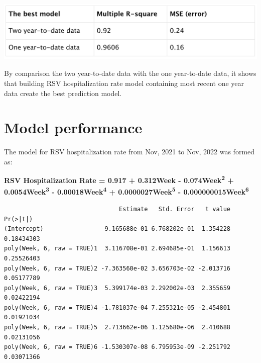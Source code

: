 \documentclass[
  letterpaper,
  DIV=11,
  numbers=noendperiod]{scrreport}
\newenvironment{Shaded}{\begin{snugshade}}{\end{snugshade}}
\newcommand{\CommentTok}[1]{\textcolor[rgb]{0.37,0.37,0.37}{#1}}
\newcommand{\FunctionTok}[1]{\textcolor[rgb]{0.28,0.35,0.67}{#1}}
\newcommand{\NormalTok}[1]{\textcolor[rgb]{0.00,0.23,0.31}{#1}}
\newcommand{\OtherTok}[1]{\textcolor[rgb]{0.00,0.23,0.31}{#1}}
\newcommand{\SpecialCharTok}[1]{\textcolor[rgb]{0.37,0.37,0.37}{#1}}
\begin{document}
\begin{Shaded}
\end{Shaded}

\includegraphics[width=5.875in,height=\textheight]{./images/paste-09152757.png}

By comparison the two year-to-date data with the one year-to-date data,
it shows that building RSV hospitalization rate model containing most
recent one year data create the best prediction model.

\hypertarget{model-performance}{%
\section{Model performance}\label{model-performance}}

The model for RSV hospitalization rate from Nov, 2021 to Nov, 2022 was
formed as:

\textbf{RSV Hospitalization Rate = 0.917 + 0.312Week -
0.074Week\textsuperscript{2} + 0.0054Week\textsuperscript{3} -
0.00018Week\textsuperscript{4} + 0.0000027Week\textsuperscript{5} -
0.000000015Week\textsuperscript{6}}

\begin{verbatim}
                                Estimate   Std. Error   t value   Pr(>|t|)
(Intercept)                 9.165688e-01 6.768202e-01  1.354228 0.18434303
poly(Week, 6, raw = TRUE)1  3.116708e-01 2.694685e-01  1.156613 0.25526403
poly(Week, 6, raw = TRUE)2 -7.363560e-02 3.656703e-02 -2.013716 0.05177789
poly(Week, 6, raw = TRUE)3  5.399174e-03 2.292002e-03  2.355659 0.02422194
poly(Week, 6, raw = TRUE)4 -1.781037e-04 7.255321e-05 -2.454801 0.01921034
poly(Week, 6, raw = TRUE)5  2.713662e-06 1.125680e-06  2.410688 0.02131056
poly(Week, 6, raw = TRUE)6 -1.530307e-08 6.795953e-09 -2.251792 0.03071366
\end{verbatim}
\end{document}
